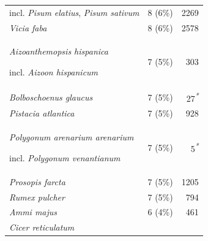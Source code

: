 \documentclass[
  authoryear,
  review]{elsarticle}
\begin{document}
\begin{table}
{\begin{tabular*}{\linewidth}{@{\extracolsep{\fill}}lrr}
incl. \emph{Pisum elatius}, \emph{Pisum sativum} & 8 (6\%) & 2269 \\ 
\emph{Vicia faba} & 8 (6\%) & 2578 \\ 
\emph{Aizoanthemopsis hispanica}

incl. \emph{Aizoon hispanicum} & 7 (5\%) & 303 \\ 
\emph{Bolboschoenus glaucus} & 7 (5\%) & 27\textsuperscript{\textit{*}} \\ 
\emph{Pistacia atlantica} & 7 (5\%) & 928 \\ 
\emph{Polygonum arenarium arenarium}

incl. \emph{Polygonum venantianum} & 7 (5\%) & 5\textsuperscript{\textit{*}} \\ 
\emph{Prosopis farcta} & 7 (5\%) & 1205 \\ 
\emph{Rumex pulcher} & 7 (5\%) & 794 \\ 
\emph{Ammi majus} & 6 (4\%) & 461 \\ 
\emph{Cicer reticulatum}


\end{tabular*}}
\end{table}
\end{document}
